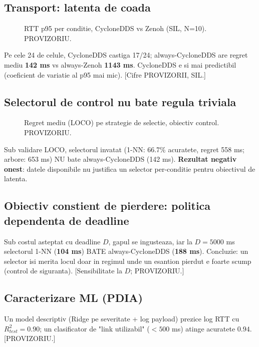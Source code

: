 \documentclass[11pt]{article}
\begin{document}
\subsection{Transport: latenta de coada}
\begin{figure}[t]\centering
  \caption{RTT p95 per conditie, CycloneDDS vs Zenoh (SIL, N=10). PROVIZORIU.}
  \label{fig:transport}
\end{figure}
Pe cele 24 de celule, CycloneDDS castiga 17/24; always-CycloneDDS are regret mediu
\textbf{142 ms} vs always-Zenoh \textbf{1143 ms}. CycloneDDS e si mai predictibil
(coeficient de variatie al p95 mai mic). [Cifre PROVIZORII, SIL.]

\subsection{Selectorul de control nu bate regula triviala}
\begin{figure}[t]\centering
  \caption{Regret mediu (LOCO) pe strategie de selectie, obiectiv control. PROVIZORIU.}
  \label{fig:selector}
\end{figure}
Sub validare LOCO, selectorul invatat (1-NN: 66.7\% acuratete, regret 558 ms; arbore: 653 ms)
NU bate always-CycloneDDS (142 ms). \textbf{Rezultat negativ onest}: datele disponibile nu
justifica un selector per-conditie pentru obiectivul de latenta.

\subsection{Obiectiv constient de pierdere: politica dependenta de deadline}
Sub costul asteptat cu deadline $D$, gapul se ingusteaza, iar la $D=5000$ ms selectorul 1-NN
(\textbf{104 ms}) BATE always-CycloneDDS (\textbf{188 ms}). Concluzie: un selector isi merita
locul doar in regimul unde un esantion pierdut e foarte scump (control de siguranta).
[Sensibilitate la $D$; PROVIZORIU.]

\subsection{Caracterizare ML (PDIA)}
Un model descriptiv (Ridge pe severitate + log payload) prezice log RTT cu $R^2_{test}=0.90$;
un clasificator de "link utilizabil" ($<500$ ms) atinge acuratete $0.94$. [PROVIZORIU.]
\end{document}
